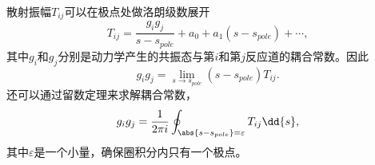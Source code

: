 散射振幅$T_{ij}$可以在极点处做洛朗级数展开
\begin{equation}
	T_{ij}=\frac{g_{i}g_{j}}{s-s_{pole}}+a_{0}+a_{1}(s-s_{pole})+\cdots,
\end{equation}
其中$g_{i}$和$g_{j}$分别是动力学产生的共振态与第$i$和第$j$反应道的耦合常数。因此
\begin{equation}
	g_{i}g_{j}=\lim_{s\to s_{pole}}(s-s_{pole})T_{ij}.
\end{equation}
还可以通过留数定理来求解耦合常数，
\begin{equation}
	g_{i}g_{j}=\frac{1}{2\pi i}\oint_{\abs{s-s_{pole}}=\varepsilon} T_{ij}\dd{s},
\end{equation}
其中$\varepsilon$是一个小量，确保圈积分内只有一个极点。\par
